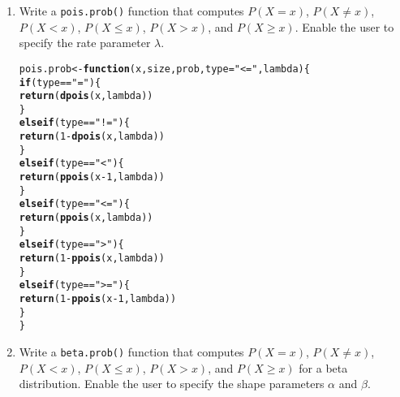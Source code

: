 \documentclass{article}\usepackage[]{graphicx}\usepackage[]{xcolor}
\makeatletter
\newcommand{\hlnum}[1]{\textcolor[rgb]{0.686,0.059,0.569}{#1}}%
\newcommand{\hlsng}[1]{\textcolor[rgb]{0.192,0.494,0.8}{#1}}%
\newcommand{\hlopt}[1]{\textcolor[rgb]{0,0,0}{#1}}%
\newcommand{\hldef}[1]{\textcolor[rgb]{0.345,0.345,0.345}{#1}}%
\newcommand{\hlkwa}[1]{\textcolor[rgb]{0.161,0.373,0.58}{\textbf{#1}}}%
\newcommand{\hlkwb}[1]{\textcolor[rgb]{0.69,0.353,0.396}{#1}}%
\newcommand{\hlkwc}[1]{\textcolor[rgb]{0.333,0.667,0.333}{#1}}%
\newcommand{\hlkwd}[1]{\textcolor[rgb]{0.737,0.353,0.396}{\textbf{#1}}}%
\newenvironment{kframe}{%
 \def\at@end@of@kframe{}%
 \ifinner\ifhmode%
  \def\at@end@of@kframe{\end{minipage}}%
  \begin{minipage}{\columnwidth}%
 \fi\fi%
 \def\FrameCommand##1{\hskip\@totalleftmargin \hskip-\fboxsep
 \colorbox{shadecolor}{##1}\hskip-\fboxsep
     \hskip-\linewidth \hskip-\@totalleftmargin \hskip\columnwidth}%
 \MakeFramed {\advance\hsize-\width
   \@totalleftmargin\z@ \linewidth\hsize
   \@setminipage}}%
 {\par\unskip\endMakeFramed%
 \at@end@of@kframe}
\newenvironment{knitrout}{}{} %
\makeatother
\begin{document}
  \begin{enumerate}
    \item Write a \texttt{pois.prob()} function that computes $P(X=x)$, 
    $P(X \neq x)$, $P(X<x)$, $P(X \leq x)$, $P(X > x)$, and $P(X \geq x).$ Enable the user to specify the rate parameter $\lambda$.
\begin{knitrout}\scriptsize
{}\color{fgcolor}\begin{kframe}
\begin{alltt}
\hldef{pois.prob} \hlkwb{<-} \hlkwa{function}\hldef{(}\hlkwc{x}\hldef{,} \hlkwc{size}\hldef{,} \hlkwc{prob}\hldef{,} \hlkwc{type}\hldef{=}\hlsng{"<="}\hldef{,} \hlkwc{lambda}\hldef{)\{}
  \hlkwa{if}\hldef{(type} \hlopt{==} \hlsng{"="}\hldef{)\{}
    \hlkwd{return}\hldef{(}\hlkwd{dpois}\hldef{(x,lambda))}
  \hldef{\}}
  \hlkwa{else if}\hldef{(type} \hlopt{==} \hlsng{"!="}\hldef{)\{}
    \hlkwd{return}\hldef{(}\hlnum{1}\hlopt{-}\hlkwd{dpois}\hldef{(x,lambda))}
  \hldef{\}}
  \hlkwa{else if}\hldef{(type} \hlopt{==} \hlsng{"<"}\hldef{)\{}
    \hlkwd{return}\hldef{(}\hlkwd{ppois}\hldef{(x}\hlopt{-}\hlnum{1}\hldef{,lambda))}
  \hldef{\}}
  \hlkwa{else if}\hldef{(type} \hlopt{==} \hlsng{"<="}\hldef{)\{}
    \hlkwd{return}\hldef{(}\hlkwd{ppois}\hldef{(x,lambda))}
  \hldef{\}}
  \hlkwa{else if}\hldef{(type} \hlopt{==} \hlsng{">"}\hldef{)\{}
    \hlkwd{return}\hldef{(}\hlnum{1}\hlopt{-}\hlkwd{ppois}\hldef{(x,lambda))}
  \hldef{\}}
  \hlkwa{else if}\hldef{(type} \hlopt{==} \hlsng{">="}\hldef{)\{}
    \hlkwd{return}\hldef{(}\hlnum{1}\hlopt{-}\hlkwd{ppois}\hldef{(x}\hlopt{-}\hlnum{1}\hldef{,lambda))}
  \hldef{\}}
\hldef{\}}
\end{alltt}
\end{kframe}
\end{knitrout}
    \item Write a \texttt{beta.prob()} function that computes $P(X=x)$, 
    $P(X \neq x)$, $P(X<x)$, $P(X \leq x)$, $P(X > x)$, and $P(X \geq x)$
    for a beta distribution. Enable the user to specify the shape parameters
    $\alpha$ and $\beta$.
\begin{knitrout}\scriptsize
{}\color{fgcolor}\begin{kframe}

\end{kframe}
\end{knitrout}
\end{enumerate}
\end{document}
